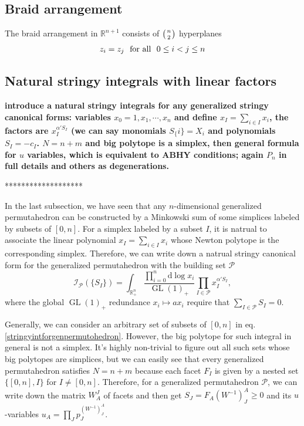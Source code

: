 \documentclass[hidelinks,12pt]{article}
\newcommand{\bea}[1]{\begin{eqnarray}\label{#1} }
\newcommand{\eea}{\end{eqnarray}}
\def\bea{\begin{eqnarray}}
\def\eea{\end{eqnarray}}
\begin{document}
\begin{enumerate}
\section*{Braid arrangement}
The braid arrangement in $\mathbb{R}^{n+1}$ consists of $\left({n}\atop{2}\right)$ hyperplanes 
\bea
z_i =z_j ~~{\rm for ~ all}~~0 \leq i<j \leq n
\eea 
\subsection{Natural stringy integrals with linear factors} 

{\bf introduce a natural stringy integrals for any generalized stringy canonical forms: variables $x_0=1, x_1, \cdots, x_n$ and define $x_I=\sum_{i \in I} x_i$, the factors are $x_I^{\alpha' S_I}$ (we can say monomials $S_\{i\}=X_i$ and polynomials $S_I=-c_I$. $N=n+m$ and big polytope is a simplex, then general formula for $u$ variables, which is equivalent to ABHY conditions; again $P_n$ in full details and others as degenerations.}

*******************

In the last subsection, we have seen that any $n$-dimensional generalized 
permutahedron can be constructed by a Minkowski sum of some simplices labeled by
subsets of $[0,n]$. For a simplex labeled by a subset $I$, 
it is natrual to associate the linear polynomial $x_I=\sum_{i\in I}x_i$ whose Newton polytope is the corresponding simplex. Therefore, we can write down a natrual stringy canonical form for the generalized permutahedron with the building set 
$\mathscr P$
\begin{equation} \label{stringyintforgenpermutohedron}
   \mathcal I_{\mathscr P}(\{S_I\})=\int_{\mathbb R^{n}_+}
	\frac{\prod_{i=0}^n \mathrm{d}\log x_i}
	{\operatorname{GL}(1)_+}\prod_{I\in\mathscr P}x_I^{\alpha' S_I},
\end{equation}
where the global $\operatorname{GL}(1)_+$ redundance $x_i\mapsto a x_i$ require that 
$\sum_{I\in\mathscr P}S_I = 0$. 

Generally, we can consider an arbitrary set of subsets of $[0,n]$ in eq.\eqref{stringyintforgenpermutohedron}. 
However, the big polytope for such integral in general is not a simplex.
It's highly non-trivial to figure out all such sets whose big polytopes are simplices,
but we can easily see that every generalized permutahedron satisfies $N=n+m$
because each facet $F_I$ is given by a nested set $\{[0,n],I\}$ for $I\neq [0,n]$.
Therefore, for a generalized permutahedron $\mathscr P$, we can write down the matrix 
$W^J_A$ of facets and then get $S_J=F_A(W^{-1})^A_J\geq 0$ and 
its $u$-variables $u_A=\prod_J p_J^{(W^{-1})^A_J}$.


\end{enumerate}
\end{document}
